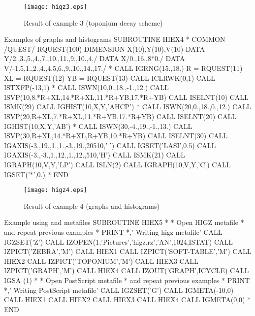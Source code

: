 \begin{figure}[p]
\begin{center}\texttt{[image: higz3.eps]}\end{center}
\caption{Result of \protect\HIGZ{} example 3 (toponium decay scheme)}
\end{figure}
\clearpage

\begin{XMPt}{Examples of graphs and histograms}
\label{HIEX4}
      SUBROUTINE HIEX4
*
      COMMON /QUEST/ RQUEST(100)
      DIMENSION X(10),Y(10),V(10)
      DATA Y/2.,3.,5.,4.,7.,10.,11.,9.,10.,4./
      DATA X/0.,16.,8*0./
      DATA V/-1.5,1.,2.,4.,4.5,6.,9.,10.,14.,17./
*
      CALL IGRNG(15.,18.)
      R  = RQUEST(11)
      XL = RQUEST(12)
      YB = RQUEST(13)
      CALL ICLRWK(0,1)
      CALL ISTXFP(-13,1)
*
      CALL ISWN(10,0.,18.,-1.,12.)
      CALL ISVP(10,8.*R+XL,14.*R+XL,11.*R+YB,17.*R+YB)
      CALL ISELNT(10)
      CALL ISMK(29)
      CALL IGHIST(10,X,Y,'AHCP')
*
      CALL ISWN(20,0.,18.,0.,12.)
      CALL ISVP(20,R+XL,7.*R+XL,11.*R+YB,17.*R+YB)
      CALL ISELNT(20)
      CALL IGHIST(10,X,Y,'AB')
*
      CALL ISWN(30,-4.,19.,-1.,13.)
      CALL ISVP(30,R+XL,14.*R+XL,R+YB,10.*R+YB)
      CALL ISELNT(30)
      CALL IGAXIS(-3.,19.,1.,1.,-3.,19.,20510,' ')
      CALL IGSET('LASI',0.5)
      CALL IGAXIS(-3.,-3.,1.,12.,1.,12.,510,'H')
      CALL ISMK(21)
      CALL IGRAPH(10,V,Y,'LP')
      CALL ISLN(2)
      CALL IGRAPH(10,V,Y,'C')
      CALL IGSET('*',0.)
*
      END
\end{XMPt}

\begin{figure}[p]
\begin{center}\texttt{[image: higz4.eps]}\end{center}
\caption{Result of \protect\HIGZ{} example 4 (graphs and histograms)}
\end{figure}
\clearpage

\begin{XMPt}{Example using \HIGZ{} and \PS{} metafiles}
      SUBROUTINE HIEX5
*
*          Open HIGZ metafile
*          and repeat previous examples
*
      PRINT *,' Writing higz metafile'
      CALL IGZSET('Z')
      CALL IZOPEN(1,'Pictures','higz.rz','AN',1024,ISTAT)
      CALL IZPICT('ZEBRA','M')
      CALL HIEX1
      CALL IZPICT('SOFT-TABLE','M')
      CALL HIEX2
      CALL IZPICT('TOPONIUM','M')
      CALL HIEX3
      CALL IZPICT('GRAPH','M')
      CALL HIEX4
      CALL IZOUT('GRAPH',ICYCLE)
      CALL IGSA (1)
*
*          Open PostScript metafile
*          and repeat previous examples
*
      PRINT *,' Writing PostScript metafile'
      CALL IGZSET('G')
      CALL IGMETA(-10,0)
      CALL HIEX1
      CALL HIEX2
      CALL HIEX3
      CALL HIEX4
      CALL IGMETA(0,0)
*
      END
\end{XMPt}

